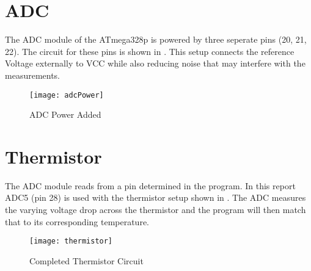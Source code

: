 \documentclass[main.tex]{subfiles}
\begin{document}
	\section{ADC}
	The ADC module of the ATmega328p is powered by three seperate pins (20, 21, 22). The circuit for
	these pins is shown in . This setup connects the reference Voltage externally to 
	VCC while also reducing noise that may interfere with the measurements.
	\begin{figure}[H]
		\begin{center}
			\texttt{[image: adcPower]}
		\end{center}
		\caption{ADC Power Added}
		\label{fig:adcPwr}
	\end{figure}

	\section{Thermistor}
	The ADC module reads from a pin determined in the program. In this report ADC5 (pin 28) is used
	with the thermistor setup shown in . The ADC measures the varying voltage drop
	across the thermistor and the program will then match that to its corresponding temperature.
	
	\begin{figure}[H]
		\begin{center}
			\texttt{[image: thermistor]}
		\end{center}
		\caption{Completed Thermistor Circuit}
		\label{fig:therm}
	\end{figure}
\end{document}
